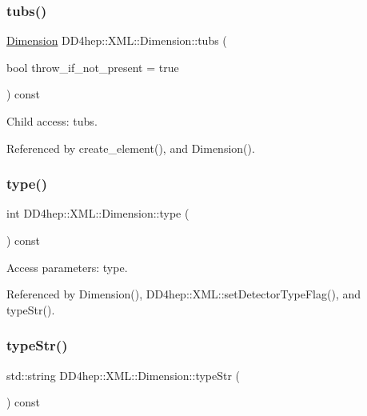 \subsubsection{\texorpdfstring{tubs()}{tubs()}}
{\footnotesize\ttfamily \hyperlink{struct_d_d4hep_1_1_x_m_l_1_1_dimension}{Dimension} D\+D4hep\+::\+X\+M\+L\+::\+Dimension\+::tubs (\begin{DoxyParamCaption}\item[{bool}]{throw\+\_\+if\+\_\+not\+\_\+present = {\ttfamily true} }\end{DoxyParamCaption}) const}



Child access\+: tubs. 



Referenced by create\+\_\+element(), and Dimension().

\hypertarget{struct_d_d4hep_1_1_x_m_l_1_1_dimension_a16f9cd30126ee86d465980e18d404c3d}{}\label{struct_d_d4hep_1_1_x_m_l_1_1_dimension_a16f9cd30126ee86d465980e18d404c3d} 
\subsubsection{\texorpdfstring{type()}{type()}}
{\footnotesize\ttfamily int D\+D4hep\+::\+X\+M\+L\+::\+Dimension\+::type (\begin{DoxyParamCaption}{ }\end{DoxyParamCaption}) const}



Access parameters\+: type. 



Referenced by Dimension(), D\+D4hep\+::\+X\+M\+L\+::set\+Detector\+Type\+Flag(), and type\+Str().

\hypertarget{struct_d_d4hep_1_1_x_m_l_1_1_dimension_a9cd1d001087fa8da92ff5c8240873133}{}\label{struct_d_d4hep_1_1_x_m_l_1_1_dimension_a9cd1d001087fa8da92ff5c8240873133} 
\subsubsection{\texorpdfstring{type\+Str()}{typeStr()}}
{\footnotesize\ttfamily std\+::string D\+D4hep\+::\+X\+M\+L\+::\+Dimension\+::type\+Str (\begin{DoxyParamCaption}{ }\end{DoxyParamCaption}) const}




